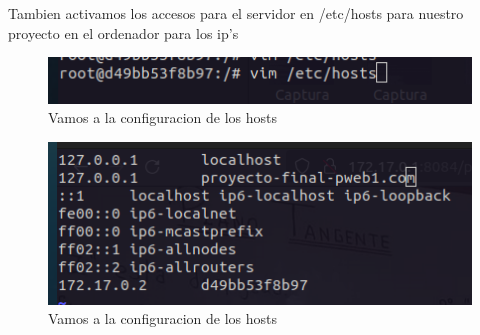 Tambien activamos los accesos para el servidor en /etc/hosts para nuestro proyecto en el ordenador para los ip's  
\begin{figure}[H]
  \centering
  \includegraphics[width=1.0\textwidth]{img/Carpeta_hosts.png}
  \caption{Vamos a la configuracion de los hosts}
\end{figure}
\begin{figure}[H]
  \centering
  \includegraphics[width=1.0\textwidth]{img/Config_hosts.png}
  \caption{Vamos a la configuracion de los hosts}
\end{figure}

